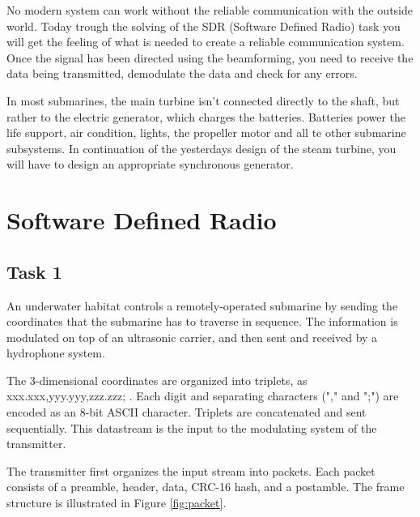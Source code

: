 \documentclass[openany]{book}
\begin{document}
	
	No modern system can work without the reliable communication with the 
	outside 
	world. Today trough the solving of the SDR (Software Defined Radio) task 
	you 
	will get the feeling of what is needed to create a reliable communication 
	system.
	Once the signal has been directed using the beamforming, you need to 
	receive 
	the data being transmitted, demodulate the data and check for any errors.
	
	In most submarines, the main turbine isn't connected directly to the shaft, 
	but 
	rather to the electric generator, which charges the batteries.
	Batteries power the life support, air condition, lights, the propeller 
	motor 
	and 
	all te other submarine subsystems. 
	In continuation of the yesterdays design of the steam turbine, you will 
	have to 
	design an appropriate synchronous generator. 
	
	
	\section{Software Defined Radio}
	
	\subsection{Task 1}
	An underwater habitat controls a remotely-operated submarine by sending the 
	coordinates that the submarine has to traverse in sequence. The information 
	is modulated on top of an ultrasonic carrier, and then sent and received by 
	a hydrophone system.
	
	The 3-dimensional coordinates are organized into triplets, as 
	\textsf{xxx.xxx,yyy.yyy,zzz.zzz;} . Each digit and separating characters 
	("\textsf{,}" and "\textsf{;}") are encoded as an 8-bit ASCII character. 
	Triplets are concatenated and sent sequentially. This datastream is the 
	input to the modulating system of the transmitter.
	
	
	The transmitter first organizes the input stream into packets. Each packet 
	consists of a preamble, header, data, CRC-16 hash, and a postamble. The 
	frame structure is illustrated in Figure \ref{fig:packet}.
	
\end{document}
